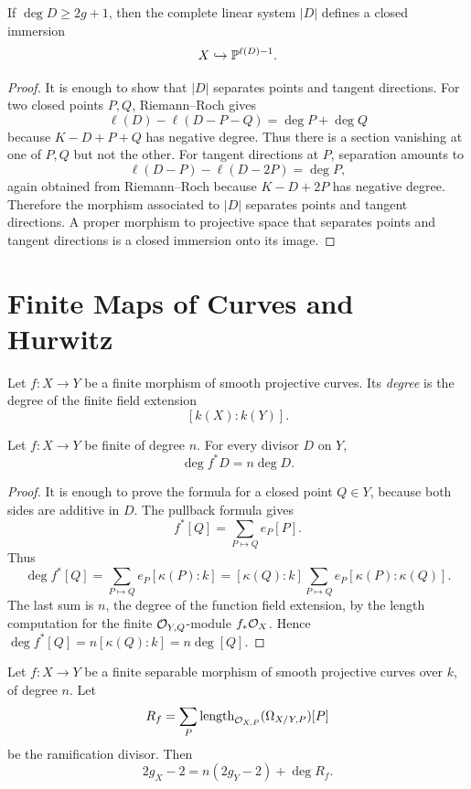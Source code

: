 \begin{proposition}
If \(\deg D\ge 2g+1\), then the complete linear system \(|D|\) defines a closed
immersion
\[
    X\hookrightarrow \mathbb{P}^{\ell(D)-1}.
\]
\end{proposition}

\begin{proof}
It is enough to show that \(|D|\) separates points and tangent directions.  For
two closed points \(P,Q\), Riemann--Roch gives
\[
    \ell(D)-\ell(D-P-Q)=\deg P+\deg Q
\]
because \(K-D+P+Q\) has negative degree.  Thus there is a section vanishing at
one of \(P,Q\) but not the other.  For tangent directions at \(P\), separation
amounts to
\[
    \ell(D-P)-\ell(D-2P)=\deg P,
\]
again obtained from Riemann--Roch because \(K-D+2P\) has negative degree.
Therefore the morphism associated to \(|D|\) separates points and tangent
directions.  A proper morphism to projective space that separates points and
tangent directions is a closed immersion onto its image.
\end{proof}

\section{Finite Maps of Curves and Hurwitz}

\begin{definition}
Let \(f:X\to Y\) be a finite morphism of smooth projective curves.  Its
\emph{degree} is the degree of the finite field extension
\[
    [k(X):k(Y)].
\]
\end{definition}

\begin{proposition}
Let \(f:X\to Y\) be finite of degree \(n\).  For every divisor \(D\) on \(Y\),
\[
    \deg f^*D=n\deg D.
\]
\end{proposition}

\begin{proof}
It is enough to prove the formula for a closed point \(Q\in Y\), because both
sides are additive in \(D\).  The pullback formula gives
\[
    f^*[Q]=\sum_{P\mapsto Q}e_P[P].
\]
Thus
\[
    \deg f^*[Q]
    =
    \sum_{P\mapsto Q}e_P[\kappa(P):k]
    =
    [\kappa(Q):k]\sum_{P\mapsto Q}e_P[\kappa(P):\kappa(Q)].
\]
The last sum is \(n\), the degree of the function field extension, by the
length computation for the finite \(\mathcal{O}_{Y,Q}\)-module \(f_*\mathcal{O}_X\).  Hence
\(\deg f^*[Q]=n[\kappa(Q):k]=n\deg[Q]\).
\end{proof}

\begin{theorem}
Let \(f:X\to Y\) be a finite separable morphism of smooth projective curves over
\(k\), of degree \(n\).  Let
\[
    R_f=\sum_P \operatorname{length}_{\mathcal{O}_{X,P}}(\Omega_{X/Y,P})[P]
\]
be the ramification divisor.  Then
\[
    2g_X-2=n(2g_Y-2)+\deg R_f.
\]
\end{theorem}

